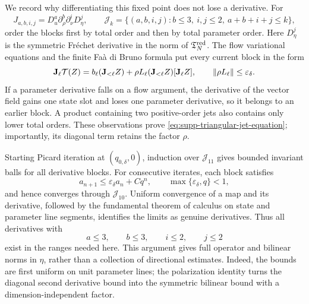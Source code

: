 We record why differentiating this fixed point does not lose a derivative.
For
\begin{equation}
 J_{a,b,i,j}=D_u^a\partial_\rho^b\partial_\nu^iD_\eta^j,\qquad
 \mathcal J_k=\{(a,b,i,j):b\le3,\ i,j\le2,\
                         a+b+i+j\le k\},
 \label{eq:supp-jet-list}
\end{equation}
order the blocks first by total order and then by total parameter order.
Here \(D_\eta^j\) is the symmetric Fr\'echet derivative in the norm of
\(\mathfrak T_N^{\rm red}\).  The flow variational equations and the
finite Fa\`a di Bruno formula put every current block in the form
\begin{equation}
 \mathbf J_\ell\mathcal T(Z)
 =b_\ell(\mathbf J_{<\ell}Z)
  +\rho L_\ell(\mathbf J_{<\ell}Z)[\mathbf J_\ell Z],
 \qquad \left\lVert\rho L_\ell\right\rVert\le\varepsilon_\delta.
 \label{eq:supp-triangular-jet-equation}
\end{equation}
If a parameter derivative falls on a flow argument, the derivative of the
vector field gains one state slot and loses one parameter derivative, so it
belongs to an earlier block.  A product containing two positive-order jets
also contains only lower total orders.  These observations prove
\eqref{eq:supp-triangular-jet-equation}; importantly, its diagonal term
retains the factor \(\rho\).

Starting Picard iteration at \((q_{0,\delta},0)\), induction over
\(\mathcal J_{11}\) gives bounded invariant balls for all derivative
blocks.  For consecutive iterates, each block satisfies
\begin{equation}
 a_{n+1}\le\varepsilon_\delta a_n+Cq^n,
 \qquad \max\{\varepsilon_\delta,q\}<1,
 \label{eq:supp-jet-recurrence}
\end{equation}
and hence converges through \(\mathcal J_{10}\).  Uniform convergence of a
map and its derivative, followed by the fundamental theorem of calculus on
state and parameter line segments, identifies the limits as genuine
derivatives.  Thus all derivatives with
\begin{equation}
 a\le3,\qquad b\le3,\qquad i\le2,\qquad j\le2
 \label{eq:supp-required-derivatives}
\end{equation}
exist in the ranges needed here.  This argument gives full operator and
bilinear norms in \(\eta\), rather than a collection of directional
estimates.  Indeed, the bounds are first uniform on unit parameter lines;
the polarization identity turns the diagonal second derivative bound into
the symmetric bilinear bound with a dimension-independent factor.

